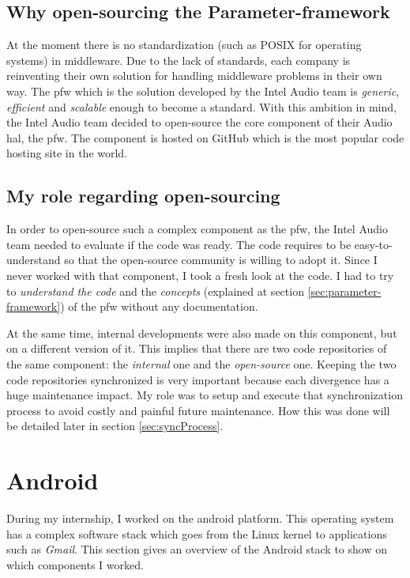 \subsection{Why open-sourcing the Parameter-framework}
At the moment there is no standardization (such as POSIX for operating systems) in middleware. Due to the lack
of standards, each company is reinventing their own solution for handling middleware problems in their own way.
The \gls{pfw} which is the solution developed by the Intel Audio team is \emph{generic}, \emph{efficient} and \emph{scalable} enough to become a standard.
With this ambition in mind, the Intel Audio team decided to open-source the core component of their Audio \gls{hal}, the \gls{pfw}.
The component is hosted on \gls{GitHub} which is the most popular code hosting site in the world.

\subsection{My role regarding open-sourcing}
In order to open-source such a complex component as the \gls{pfw}, the Intel Audio team needed to evaluate if the code was ready.
The code requires to be easy-to-understand so that the open-source community is willing to adopt it.
Since I never worked with that component, I took a fresh look at the code. I had to try to \emph{understand the code} and the
\emph{concepts} (explained at section \ref{sec:parameter-framework}) of the \gls{pfw} without any documentation.

At the same time, internal developments were also made on this component, but on a different version of it.
This implies that there are two code repositories of the same component: the \emph{internal} one and the \emph{open-source} one.
Keeping the two code repositories synchronized is very important because each divergence has a huge maintenance impact.
My role was to setup and execute that synchronization process to avoid costly and painful future maintenance.
How this was done will be detailed later in section \ref{sec:syncProcess}.



\section{Android}
During my internship, I worked on the \gls{android} platform. This operating
system has a complex software stack which goes from the Linux \gls{kernel} to
applications such as \emph{Gmail}. This section gives an overview of the Android
stack to show on which components I worked.

